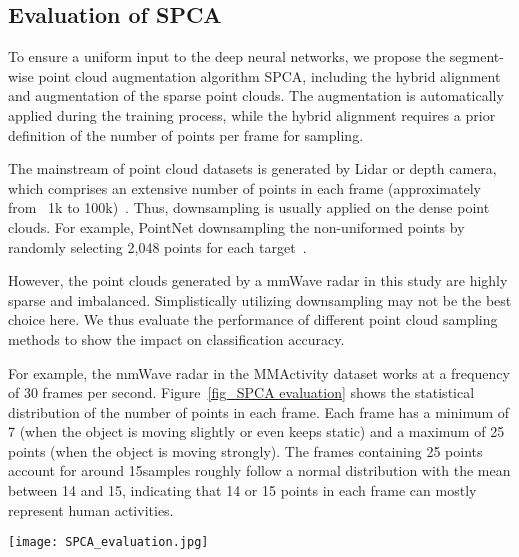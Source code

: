 \subsection{Evaluation of SPCA}

To ensure a uniform input to the deep neural networks, we propose the segment-wise point cloud augmentation algorithm SPCA, including the hybrid alignment and augmentation of the sparse point clouds. The augmentation is automatically applied during the training process, while the hybrid alignment requires a prior definition of the number of points per frame for sampling.

The mainstream of point cloud datasets is generated by Lidar or depth camera, which comprises an extensive number of points in each frame (approximately from ~1k to 100k)~\cite{zhou2018voxelnet}. 
Thus, downsampling is usually applied on the dense point clouds. 
For example, PointNet downsampling the non-uniformed points by randomly selecting 2,048 points for each target~\cite{qi2017pointnet}. 

However, the point clouds generated by a mmWave radar in this study are highly sparse and imbalanced. 
Simplistically utilizing downsampling may not be the best choice here. 
We thus evaluate the performance of different point cloud sampling methods to show the impact on classification accuracy. 

For example, the mmWave radar in the MMActivity dataset works at a frequency of 30 frames per second. 
Figure~\ref{fig_SPCA evaluation} shows the statistical distribution of the number of points in each frame. 
Each frame has a minimum of 7 (when the object is moving slightly or even keeps static) and a maximum of 25 points (when the object is moving strongly). 
The frames containing 25 points account for around 15\Other samples roughly follow a normal distribution with the mean between 14 and 15, indicating that 14 or 15 points in each frame can mostly represent human activities.


\begin{figure*}[h]
    \centering
    \texttt{[image: SPCA\_evaluation.jpg]}
    \caption{The statistics and impact of number of points per frame on the MMActivity dataset}
    \label{fig_SPCA evaluation}
\end{figure*}

